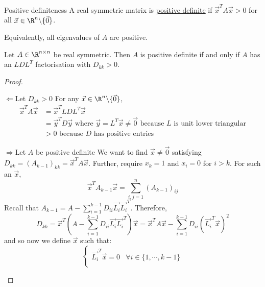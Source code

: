 \documentclass[../Main.tex]{subfiles}
\begin{document}
\begin{definition}{Positive definiteness}
    A real symmetric matrix is \underline{positive definite} if $\vec{x}^T A \vec{x} > 0$ for all $\vec{x} \in \R^n \backslash \{\vec0\}$.
\end{definition}
\begin{remark}
    Equivalently, all eigenvalues of $A$ are positive.
\end{remark}
\begin{theorem}
    Let $A \in \R^{n \times n}$ be real symmetric. Then $A$ is positive definite if and only if $A$ has an $LDL^T$ factorisation with $D_{kk} > 0$.
    \label{thmLDLPosDef}
\end{theorem}
\begin{proof}
    \begin{proofdirection}{$\Leftarrow$}{Let $D_{kk} > 0$}
        For any $\vec{x} \in \R^n \backslash \{\vec0\}$,
        \begin{align*}
            \vec{x}^T A \vec{x} &= \vec{x}^T L D L^T \vec{x} \\
            &= \vec{y}^T D \vec{y} \text{ where $\vec{y} = L^T \vec{x} \neq \vec0$ because $L$ is unit lower triangular} \\
            &> 0 \text{ because $D$ has positive entries}
        \end{align*}
    \end{proofdirection}
    \begin{proofdirection}{$\Rightarrow$}{Let $A$ be positive definite}
        We want to find $\vec{x} \neq \vec0$ satisfying $D_{kk} = (A_{k-1})_{kk} = \vec{x}^T A \vec{x}$. Further, require $x_k = 1$ and $x_i = 0$ for $i > k$. For such an $\vec{x}$,
        \begin{equation*}
            \vec{x}^T A_{k-1} \vec{x} = \sum_{i,j=1}^{n} (A_{k-1})_{ij} 
        \end{equation*}
        Recall that $A_{k-1} = A - \sum_{i=1}^{k-1} D_{ii} \vec{L_i} \vec{L_i}^T$. Therefore,
        \begin{equation*}
            D_{kk} = \vec{x}^T \left(A- \sum_{i=1}^{k-1} D_{ii} \vec{L_i} \vec{L_i}^T\right)\vec{x} = \vec{x}^T A\vec{x} - \sum_{i=1}^{k-1} D_{ii} \left(\vec{L_i}^T \vec{x}\right)^2
        \end{equation*}
        and so now we define $\vec{x}$ such that:
        \begin{equation*}
            \begin{cases}
                \vec{L_i}^T \vec{x} = 0 & \forall i \in \{1, \cdots, k-1\} \\

\end{cases}
\end{equation*}
\end{proofdirection}
\end{proof}
\end{document}
